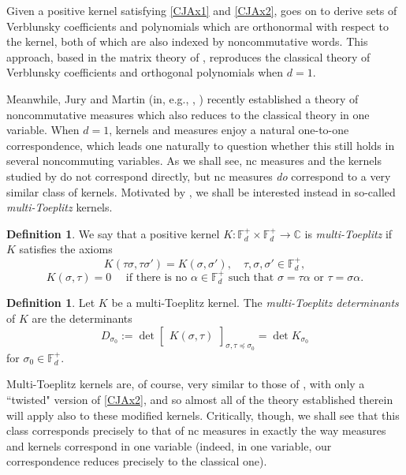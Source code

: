 \documentclass[11pt,reqno]{amsart}
\def\a{\alpha}
\def\s{\sigma}
\def\t{\tau}
\def\CC{\mathbb{C}}
\def\FF{\mathbb{F}}
\theoremstyle{definition}
\newtheorem{definition}[theorem]{Definition}
\numberwithin{equation}{section}
\begin{document}
Given a positive kernel satisfying \eqref{CJAx1} and \eqref{CJAx2}, \cite{CJ02b} goes on to derive sets of Verblunsky coefficients and polynomials which are orthonormal with respect to the kernel, both of which are also indexed by noncommutative words. This approach, based in the matrix theory of \cite{Con96}, reproduces the classical theory of Verblunsky coefficients and orthogonal polynomials when \(d = 1\).

Meanwhile, Jury and Martin (in, e.g., \cite{JM22a}, \cite{JM22b}) recently established a theory of noncommutative measures which also reduces to the classical theory in one variable. When \(d = 1\), kernels and measures enjoy a natural one-to-one correspondence, which leads one naturally to question whether this still holds in several noncommuting variables. As we shall see, nc measures and the kernels studied by \cite{CJ02b} do not correspond directly, but nc measures \emph{do} correspond to a very similar class of kernels. Motivated by , we shall be interested instead in so-called \emph{multi-Toeplitz} kernels.

\begin{definition}
    \label{def:multiToeplitzKernel}
    We say that a positive kernel \(K : \FF_d^+ \times \FF_d^+ \to \CC\) is \emph{multi-Toeplitz} if \(K\) satisfies the axioms
    \begin{equation}
    \label{CJAx1'}
        K(\t \s, \t\s') = K(\s,\s'), \quad \t, \s, \s' \in \FF^+_d,
    \end{equation}
    \begin{equation}
    \label{CJAx2'}
        K(\sigma, \tau) = 0 \quad \text{ if there is no \(\a \in \FF_d^+\) such that \(\s = \t\a\) or \(\t = \s\a\).}
    \end{equation}
\end{definition}

\begin{definition}
    \label{def:multiToeplitzDeterminants}
    Let \(K\) be a multi-Toeplitz kernel. The \emph{multi-Toeplitz determinants} of \(K\) are the determinants
    \[
        D_{\s_0} := \det \begin{bmatrix}
            K(\s, \t)
        \end{bmatrix}_{\s,\t \preceq \s_0} = \det K_{\s_0}
    \]
    for \(\s_0 \in \FF_d^+\).
\end{definition}

Multi-Toeplitz kernels are, of course, very similar to those of \cite{CJ02b}, with only a ``twisted" version of \eqref{CJAx2}, and so almost all of the theory established therein will apply also to these modified kernels. Critically, though, we shall see that this class corresponds precisely to that of nc measures in exactly the way measures and kernels correspond in one variable (indeed, in one variable, our correspondence reduces precisely to the classical one). 
\end{document}
